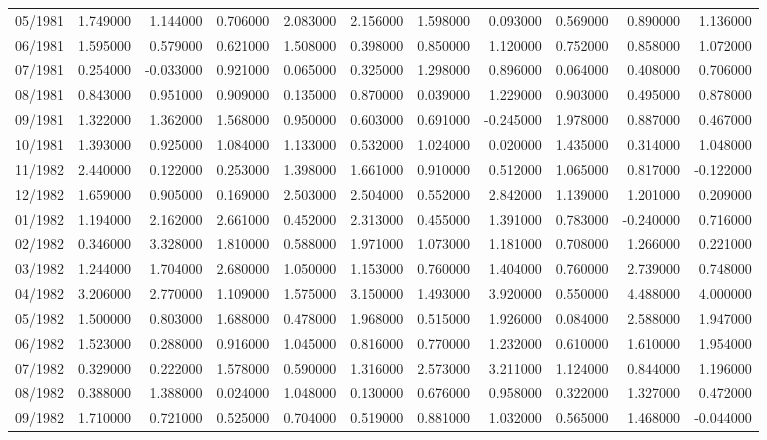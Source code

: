 \begin{tabular}{lrrrrrrrrrr}
05/1981 & 1.749000 & 1.144000 & 0.706000 & 2.083000 & 2.156000 & 1.598000 & 0.093000 & 0.569000 & 0.890000 & 1.136000 \\
06/1981 & 1.595000 & 0.579000 & 0.621000 & 1.508000 & 0.398000 & 0.850000 & 1.120000 & 0.752000 & 0.858000 & 1.072000 \\
07/1981 & 0.254000 & -0.033000 & 0.921000 & 0.065000 & 0.325000 & 1.298000 & 0.896000 & 0.064000 & 0.408000 & 0.706000 \\
08/1981 & 0.843000 & 0.951000 & 0.909000 & 0.135000 & 0.870000 & 0.039000 & 1.229000 & 0.903000 & 0.495000 & 0.878000 \\
09/1981 & 1.322000 & 1.362000 & 1.568000 & 0.950000 & 0.603000 & 0.691000 & -0.245000 & 1.978000 & 0.887000 & 0.467000 \\
10/1981 & 1.393000 & 0.925000 & 1.084000 & 1.133000 & 0.532000 & 1.024000 & 0.020000 & 1.435000 & 0.314000 & 1.048000 \\
11/1982 & 2.440000 & 0.122000 & 0.253000 & 1.398000 & 1.661000 & 0.910000 & 0.512000 & 1.065000 & 0.817000 & -0.122000 \\
12/1982 & 1.659000 & 0.905000 & 0.169000 & 2.503000 & 2.504000 & 0.552000 & 2.842000 & 1.139000 & 1.201000 & 0.209000 \\
01/1982 & 1.194000 & 2.162000 & 2.661000 & 0.452000 & 2.313000 & 0.455000 & 1.391000 & 0.783000 & -0.240000 & 0.716000 \\
02/1982 & 0.346000 & 3.328000 & 1.810000 & 0.588000 & 1.971000 & 1.073000 & 1.181000 & 0.708000 & 1.266000 & 0.221000 \\
03/1982 & 1.244000 & 1.704000 & 2.680000 & 1.050000 & 1.153000 & 0.760000 & 1.404000 & 0.760000 & 2.739000 & 0.748000 \\
04/1982 & 3.206000 & 2.770000 & 1.109000 & 1.575000 & 3.150000 & 1.493000 & 3.920000 & 0.550000 & 4.488000 & 4.000000 \\
05/1982 & 1.500000 & 0.803000 & 1.688000 & 0.478000 & 1.968000 & 0.515000 & 1.926000 & 0.084000 & 2.588000 & 1.947000 \\
06/1982 & 1.523000 & 0.288000 & 0.916000 & 1.045000 & 0.816000 & 0.770000 & 1.232000 & 0.610000 & 1.610000 & 1.954000 \\
07/1982 & 0.329000 & 0.222000 & 1.578000 & 0.590000 & 1.316000 & 2.573000 & 3.211000 & 1.124000 & 0.844000 & 1.196000 \\
08/1982 & 0.388000 & 1.388000 & 0.024000 & 1.048000 & 0.130000 & 0.676000 & 0.958000 & 0.322000 & 1.327000 & 0.472000 \\
09/1982 & 1.710000 & 0.721000 & 0.525000 & 0.704000 & 0.519000 & 0.881000 & 1.032000 & 0.565000 & 1.468000 & -0.044000 \\

\end{tabular}
